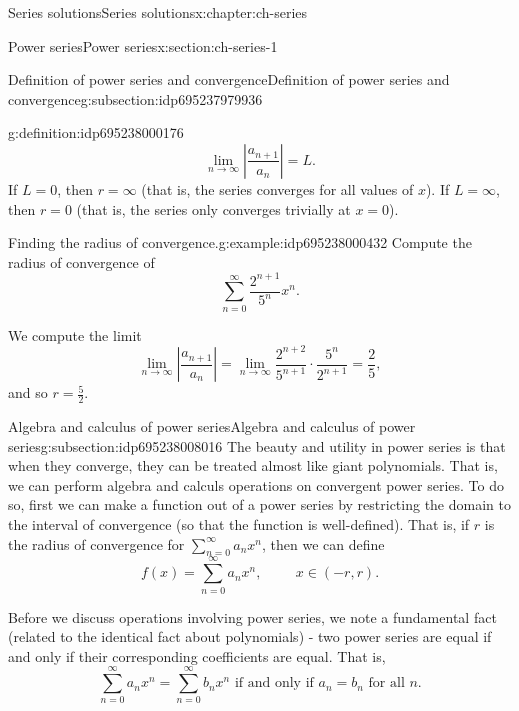 \documentclass[oneside,10pt,]{book}
\numberwithin{equation}{section}
\newcommand{\abs}[1]{\left\vert#1\right\vert}
\numberwithin{equation}{section}
\newcommand{\ps}{\displaystyle \sum_{n=0}^\infty a_n x^n}
\begin{document}
\begin{chapterptx}{Series solutions}{}{Series solutions}{}{}{x:chapter:ch-series}
\begin{sectionptx}{Power series}{}{Power series}{}{}{x:section:ch-series-1}
\begin{subsectionptx}{Definition of power series and convergence}{}{Definition of power series and convergence}{}{}{g:subsection:idp695237979936}
\begin{definition}{}{g:definition:idp695238000176}
\begin{equation*}
\lim_{n\to\infty} \abs{\frac{a_{n+1}}{a_n}} = L.
\end{equation*}
If \(L = 0\), then \(r = \infty\) (that is, the series converges for all values of \(x\)). If \(L = \infty\), then \(r = 0\) (that is, the series only converges trivially at \(x = 0\)).%
\end{definition}
\begin{example}{Finding the radius of convergence.}{g:example:idp695238000432}%
Compute the radius of convergence of%
\begin{equation*}
\sum_{n=0}^\infty \frac{2^{n+1}}{5^n} x^n.
\end{equation*}
%
\par
We compute the limit%
\begin{equation*}
\lim_{n\to \infty}\abs{\frac{a_{n+1}}{a_n}} = \lim_{n\to \infty} \frac{2^{n+2}}{5^{n+1}} \cdot \frac{5^n}{2^{n + 1}} = \frac{2}{5},
\end{equation*}
and so \(r = \frac{5}{2}\).%
\end{example}
\end{subsectionptx}
%
%
\typeout{************************************************}
\typeout{************************************************}
%
\begin{subsectionptx}{Algebra and calculus of power series}{}{Algebra and calculus of power series}{}{}{g:subsection:idp695238008016}
The beauty and utility in power series is that when they converge, they can be treated almost like giant polynomials. That is, we can perform algebra and calculs operations on convergent power series. To do so, first we can make a function out of a power series by restricting the domain to the interval of convergence (so that the function is well-defined). That is, if \(r\) is the radius of convergence for \(\ps\), then we can define%
\begin{equation*}
f(x) = \ps, \hspace{1cm} x \in (-r,r).
\end{equation*}
%
\par
Before we discuss operations involving power series, we note a fundamental fact (related to the identical fact about polynomials) - two power series are equal if and only if their corresponding coefficients are equal. That is,%
\begin{equation*}
\ps = \sum_{n=0}^\infty b_n x^n \text{ if and only if } a_n = b_n \text{ for all } n.
\end{equation*}
%
\par

\end{subsectionptx}
\end{sectionptx}
\end{chapterptx}
\end{document}
